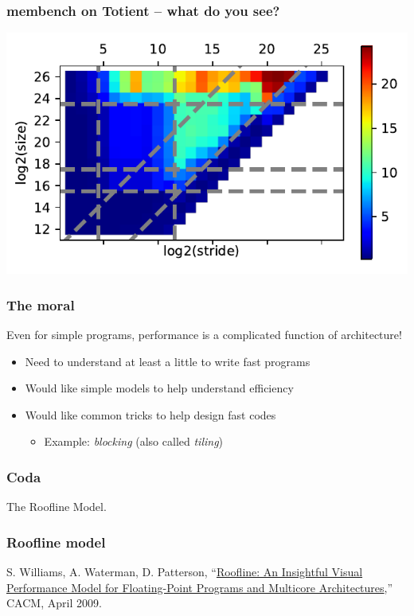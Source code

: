 \documentclass{beamer}
\begin{document}
\begin{frame}
    \frametitle{membench on Totient -- what do you see?}

  \begin{center}
    \includegraphics[width=\textwidth]{figs/membench/timings_totient-heat.pdf}
  \end{center}
\end{frame}


\begin{frame}
  \frametitle{The moral}
  
  Even for simple programs, performance is a complicated function of
  architecture!
  \begin{itemize}
  \item Need to understand at least a little to write fast programs
  \item Would like simple models to help understand efficiency
  \item Would like common tricks to help design fast codes
    \begin{itemize}
    \item Example: {\em blocking} (also called {\em tiling})
    \end{itemize}
  \end{itemize}
\end{frame}


\begin{frame}
  \frametitle{Coda}
  The Roofline Model.
\end{frame}


\begin{frame}
  \frametitle{Roofline model}

  S. Williams, A. Waterman, D. Patterson,
  ``\href{http://www.eecs.berkeley.edu/Pubs/TechRpts/2008/EECS-2008-134.pdf}{Roofline:
    An Insightful Visual Performance Model for Floating-Point Programs
    and Multicore Architectures},'' CACM, April 2009.
\end{frame}
\end{document}
